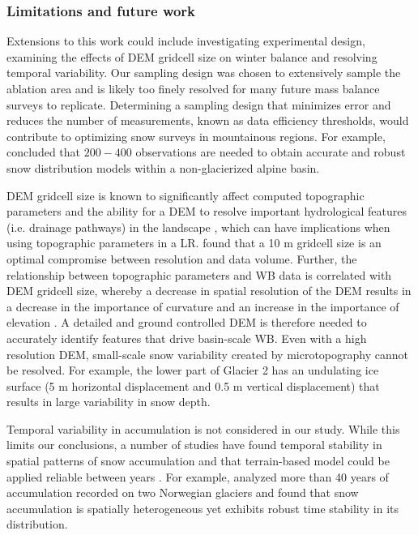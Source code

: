 \documentclass[twocolumn, letterpaper]{igs}
\begin{document}
\subsubsection{Limitations and future work}

Extensions to this work could include investigating experimental design, examining the effects of DEM gridcell size on winter balance and resolving temporal variability. Our sampling design was chosen to extensively sample the ablation area and is likely too finely resolved for many future mass balance surveys to replicate. Determining a sampling design that minimizes error and reduces the number of measurements, known as data efficiency thresholds, would contribute to optimizing snow surveys in mountainous regions. For example, \cite{Lopez2010} concluded that $200-400$ observations are needed to obtain accurate and robust snow distribution models within a non-glacierized alpine basin. 

DEM gridcell size is known to significantly affect computed topographic parameters and the ability for a DEM to resolve important hydrological features (i.e. drainage pathways) in the landscape \citep{Zhang1994, Garbrecht1994, Guo-an2001, Lopez2010}, which can have implications when using topographic parameters in a LR. \cite{Zhang1994} found that a 10 m gridcell size is an optimal compromise between resolution and data volume. Further, the relationship between topographic parameters and WB data is correlated with DEM gridcell size, whereby a decrease in spatial resolution of the DEM results in a decrease in the importance of curvature and an increase in the importance of elevation \citep[e.g.][]{Kienzle2004, Lopez2010}. A detailed and ground controlled DEM is therefore needed to accurately identify features that drive basin-scale WB. Even with a high resolution DEM, small-scale snow variability created by microtopography cannot be resolved. For example, the lower part of Glacier 2 has an undulating ice surface (5 m horizontal displacement and 0.5 m vertical displacement) that results in large variability in snow depth.

Temporal variability in accumulation is not considered in our study. While this limits our conclusions, a number of studies have found temporal stability in spatial patterns of snow accumulation and that terrain-based model could be applied reliable between years \citep[e.g.][]{Grunewald2013}. For example, \cite{Walmsley2015} analyzed more than 40 years of accumulation recorded on two Norwegian glaciers and found that snow accumulation is spatially heterogeneous yet exhibits robust time stability in its distribution. 
\end{document}
